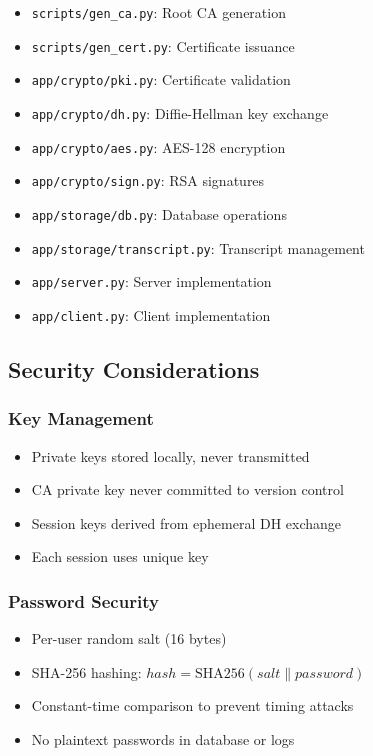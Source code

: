 \documentclass[runningheads]{llncs}
\begin{document}
\begin{itemize}
    \item \texttt{scripts/gen\_ca.py}: Root CA generation
    \item \texttt{scripts/gen\_cert.py}: Certificate issuance
    \item \texttt{app/crypto/pki.py}: Certificate validation
    \item \texttt{app/crypto/dh.py}: Diffie-Hellman key exchange
    \item \texttt{app/crypto/aes.py}: AES-128 encryption
    \item \texttt{app/crypto/sign.py}: RSA signatures
    \item \texttt{app/storage/db.py}: Database operations
    \item \texttt{app/storage/transcript.py}: Transcript management
    \item \texttt{app/server.py}: Server implementation
    \item \texttt{app/client.py}: Client implementation
\end{itemize}

\subsection{Security Considerations}

\subsubsection{Key Management}

\begin{itemize}
    \item Private keys stored locally, never transmitted
    \item CA private key never committed to version control
    \item Session keys derived from ephemeral DH exchange
    \item Each session uses unique key
\end{itemize}

\subsubsection{Password Security}

\begin{itemize}
    \item Per-user random salt (16 bytes)
    \item SHA-256 hashing: $hash = \text{SHA256}(salt \| password)$
    \item Constant-time comparison to prevent timing attacks
    \item No plaintext passwords in database or logs
\end{itemize}
\end{document}
